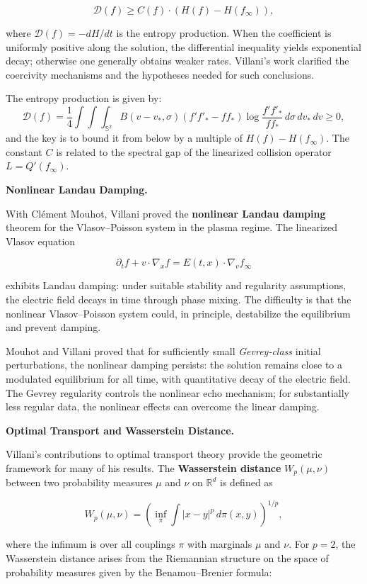 \[
\mathcal{D}(f) \geq C(f) \cdot (H(f) - H(f_\infty)),
\]

where $\mathcal{D}(f) = -dH/dt$ is the entropy production. When the
coefficient is uniformly positive along the solution, the differential
inequality yields exponential decay; otherwise one generally obtains weaker
rates. Villani's work clarified the coercivity mechanisms and the hypotheses
needed for such conclusions.

The entropy production is given by:
\[
\mathcal{D}(f) = \frac{1}{4} \int \int \int_{\mathbb{S}^2} B(v-v_*, \sigma) (f' f'_* - f f_*) \log \frac{f' f'_*}{f f_*} \, d\sigma \, dv_* \, dv \ge 0,
\]
and the key is to bound it from below by a multiple of $H(f) - H(f_\infty)$. The constant $C$ is related to the spectral gap of the linearized collision operator $L = Q'(f_\infty)$.

\textbf{Nonlinear Landau Damping.}

With Clément Mouhot, Villani proved the \textbf{nonlinear Landau damping} theorem for the Vlasov--Poisson system in the plasma regime. The linearized Vlasov equation

\[
\partial_t f + v \cdot \nabla_x f = E(t,x) \cdot \nabla_v f_\infty
\]

exhibits Landau damping: under suitable stability and regularity assumptions,
the electric field decays in time through phase mixing. The difficulty is
that the nonlinear Vlasov--Poisson system could, in principle, destabilize the
equilibrium and prevent damping.

Mouhot and Villani proved that for sufficiently small \emph{Gevrey-class}
initial perturbations, the nonlinear damping persists: the solution remains
close to a modulated equilibrium for all time, with quantitative decay of the
electric field. The Gevrey regularity controls the nonlinear echo mechanism;
for substantially less regular data, the nonlinear effects can overcome the
linear damping.

\textbf{Optimal Transport and Wasserstein Distance.}

Villani's contributions to optimal transport theory provide the geometric framework for many of his results. The \textbf{Wasserstein distance} $W_p(\mu,\nu)$ between two probability measures $\mu$ and $\nu$ on $\mathbb{R}^d$ is defined as

\[
W_p(\mu,\nu) = \left( \inf_{\pi} \int |x-y|^p \, d\pi(x,y) \right)^{1/p},
\]

where the infimum is over all couplings $\pi$ with marginals $\mu$ and $\nu$. For $p=2$, the Wasserstein distance arises from the Riemannian structure on the space of probability measures given by the Benamou--Brenier formula:


